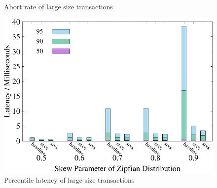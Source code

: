 \begin{figure}[t]
\begin{minipage}[b]{0.32\linewidth}
        \caption{Abort rate of large size transactions}
        \label{fig:weighted:abort1}
    \end{minipage}
    \begin{minipage}[b]{0.32\linewidth}
        \centering
        \includegraphics[width=\textwidth]{./exp_fig/weighted_size/percent95_latency_1}
        \vspace{-2em}
        \caption{Percentile latency of large size transactions}
        \label{fig:weighted:p951}
    \end{minipage}
\end{figure}


